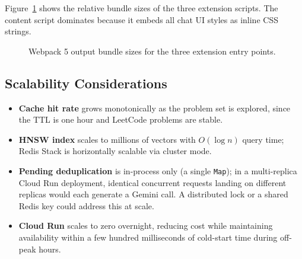 \documentclass[11pt,a4paper]{article}
\begin{document}
Figure~\ref{fig:bundles} shows the relative bundle sizes of the three extension
scripts.  The content script dominates because it embeds all chat UI styles as
inline CSS strings.

\begin{figure}[H]
\centering
{}
\caption{Webpack 5 output bundle sizes for the three extension entry points.}
\label{fig:bundles}
\end{figure}

\subsection{Scalability Considerations}

\begin{itemize}[noitemsep]
  \item \textbf{Cache hit rate} grows monotonically as the problem set is
        explored, since the TTL is one hour and LeetCode problems are stable.
  \item \textbf{HNSW index} scales to millions of vectors with $O(\log n)$
        query time; Redis Stack is horizontally scalable via cluster mode.
  \item \textbf{Pending deduplication} is in-process only (a single
        \texttt{Map}); in a multi-replica Cloud Run deployment, identical
        concurrent requests landing on different replicas would each generate
        a Gemini call.  A distributed lock or a shared Redis key could address
        this at scale.
  \item \textbf{Cloud Run} scales to zero overnight, reducing cost while
        maintaining availability within a few hundred milliseconds of cold-start
        time during off-peak hours.
\end{itemize}
\end{document}

